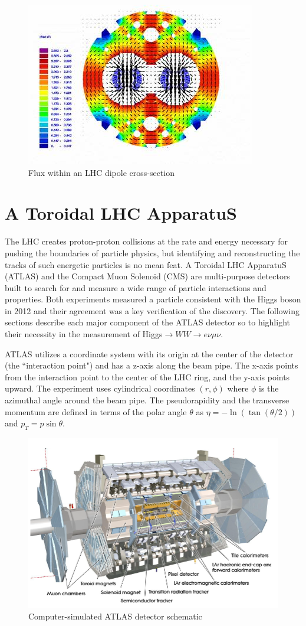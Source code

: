 \begin{figure}[!h]
        \centering
    \includegraphics[width=.6\textwidth]{Pictures/dipolemagnet.jpg}
    \caption{ Flux within an LHC dipole cross-section \cite{LHCref}}
    \label{fig:dipolemagnet}
\end{figure}

\section{A Toroidal LHC ApparatuS}
\hspace{20pt} The LHC creates proton-proton collisions at the rate and energy necessary for pushing the boundaries of particle physics, but identifying and reconstructing the tracks of such energetic particles is no mean feat. A Toroidal LHC ApparatuS (ATLAS) and the Compact Muon Solenoid (CMS) are multi-purpose detectors built to search for and measure a wide range of particle interactions and properties. Both experiments measured a particle consistent with the Higgs boson in 2012 and their agreement was a key verification of the discovery. The following sections describe each major component of the ATLAS detector so to highlight their necessity in the measurement of Higgs$\rightarrow WW \rightarrow e\nu\mu\nu$. 

ATLAS utilizes a coordinate system with its origin at the center of the detector (the ``interaction point") and has a z-axis along the beam pipe. The x-axis points from the interaction point to the center of the LHC ring, and the y-axis points upward. The experiment uses cylindrical coordinates $(r, \phi)$ where $\phi$ is the azimuthal angle around the beam pipe. The pseudorapidity and the transverse momentum are defined in terms of the polar angle $\theta$ as $\eta = -\ln( \tan(\theta/2))$ and $p_T = p\sin\theta$. 
\begin{figure}[!h]
	\centering     \includegraphics[width=.7\textwidth]{Pictures/ATLASdetector.PNG}
    \caption{Computer-simulated ATLAS detector schematic \cite{detector}}
\end{figure}

